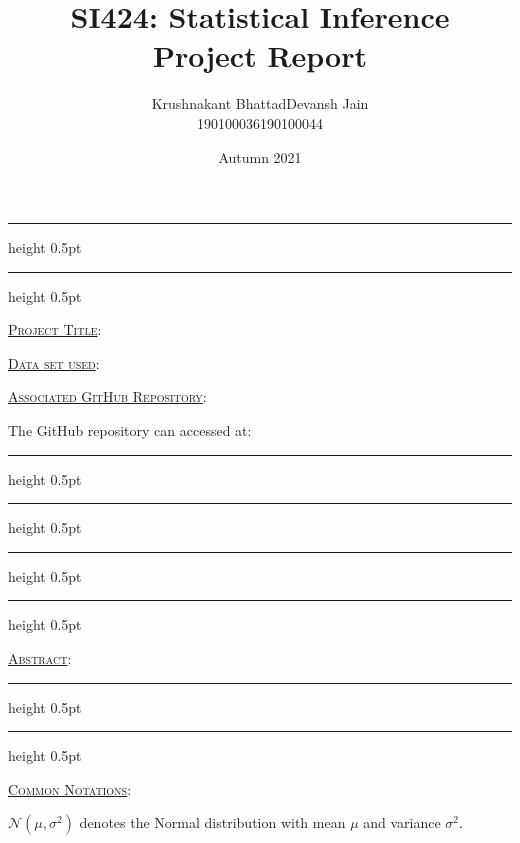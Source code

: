 \documentclass[fleqn, 11pt]{article}
\title{SI424: Statistical Inference \\ Project Report}
\author{
\begin{tabular}{|c|c|}
     \hline
     \textsf{Krushnakant Bhattad} & \textsf{ \hspace{5pt} Devansh Jain \hspace{5pt} } \\
     \hline
     \textsf{190100036} & \textsf{190100044}\\
     \hline
\end{tabular}
}
\date{Autumn 2021}
\newcommand{\myline}{
  \par
  \kern3pt %
  \hrule height 0.5pt
  \kern2pt %
  \hrule height 0.5pt
  \kern3pt %
  \par
}
\renewcommand{\arraystretch}{2}%
\begin{document}
\maketitle
\thispagestyle{empty}
\renewcommand{\arraystretch}{1}%

\myline

\vspace{7pt}

\underline{\large {\textsc{Project Title}}}:

\medskip


\hrulefill

\vspace{10pt}

\underline{\large {\textsc{Data set used}}}:

\medskip


\hrulefill

\vspace{10pt}

\underline{\large {\textsc{Associated GitHub Repository}}}:

\medskip

The GitHub repository can accessed at:

\vspace{7pt}

\myline

\newpage

\setcounter{page}{1}

\vspace{-2em}
\myline

\vspace{10pt}

\underline{\large {\textsc{Abstract}}}:

\medskip


\vspace{7pt}

\myline

\vspace{10pt}

\underline{\large {\textsc{Common Notations}}}:

\medskip


$\mathcal{N}(\mu, \sigma^2)$ denotes the Normal distribution with mean $\mu$ and variance $\sigma^2$.

\begin{comment}
It has the probability distribution: $p(x) = \dfrac{1}{\sqrt{2 \pi \sigma^2}} \exp \left(\dfrac{-(x-\mu)^2}{2 \sigma^2}\right)$
\end{comment}
\end{document}

